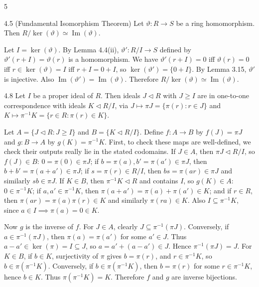 \documentclass[8pt]{extarticle}
\makeatletter
\renewenvironment{proof}[1][\proofname]{%
  \par%
  \pushQED{\qed}%
  \normalfont
  \topsep=2pt\partopsep=0pt\parsep=0pt\itemsep=0pt%
  \trivlist
  \item[\hskip\labelsep\itshape #1\@addpunct{.}]\ignorespaces
}{%
  \popQED\endtrivlist\@endpefalse
  \vspace{-1pt}%
}
\makeatother
\begin{document}
\begin{multicols*}{5}
        \begin{theorem}{4.5}
            (Fundamental Isomorphism Theorem) Let \(\vartheta:R\to S\) be a ring homomorphism. Then \(R/\ker(\vartheta)\simeq\operatorname{Im}(\vartheta)\).
        \end{theorem}

        \begin{proof}
            Let \(I=\ker(\vartheta)\). By Lemma 4.4(ii), \(\vartheta':R/I\to S\) defined by \(\vartheta'(r+I)=\vartheta(r)\) is a homomorphism. We have \(\vartheta'(r+I)=0\) iff \(\vartheta(r)=0\) iff \(r\in\ker(\vartheta)=I\) iff \(r+I=0+I\), so \(\ker(\vartheta')=\{0+I\}\). By Lemma 3.15, \(\vartheta'\) is injective. Also \(\operatorname{Im}(\vartheta')=\operatorname{Im}(\vartheta)\). Therefore \(R/\ker(\vartheta)\simeq\operatorname{Im}(\vartheta)\).
        \end{proof}

        \begin{theorem}{4.8}
            Let \(I\) be a proper ideal of \(R\). Then ideals \(J\lhd R\) with \(J\ge I\) are in one-to-one correspondence with ideals \(K\lhd R/I\), via \(J\mapsto\pi J=\{\pi(r):r\in J\}\) and \(K\mapsto\pi^{-1}K=\{r\in R:\pi(r)\in K\}\).
        \end{theorem}

        \begin{proof}
            Let \(A=\{J\lhd R:J\ge I\}\) and \(B=\{K\lhd R/I\}\). Define \(f:A\to B\) by \(f(J)=\pi J\) and \(g:B\to A\) by \(g(K)=\pi^{-1}K\). First, to check these maps are well-defined, we check their outputs really lie in the stated codomains. If \(J\in A\), then \(\pi J\lhd R/I\), so \(f(J)\in B\): \(0=\pi(0)\in\pi J\); if \(b=\pi(a),b'=\pi(a')\in\pi J\), then \(b+b'=\pi(a+a')\in\pi J\); if \(s=\pi(r)\in R/I\), then \(bs=\pi(ar)\in\pi J\) and similarly \(sb\in\pi J\). If \(K\in B\), then \(\pi^{-1}K\lhd R\) and contains \(I\), so \(g(K)\in A\): \(0\in\pi^{-1}K\); if \(a,a'\in\pi^{-1}K\), then \(\pi(a+a')=\pi(a)+\pi(a')\in K\); and if \(r\in R\), then \(\pi(ar)=\pi(a)\pi(r)\in K\) and similarly \(\pi(ra)\in K\). Also \(I\subseteq\pi^{-1}K\), since \(a\in I\implies\pi(a)=0\in K\).

            Now \(g\) is the inverse of \(f\). For \(J\in A\), clearly \(J\subseteq\pi^{-1}(\pi J)\). Conversely, if \(a\in\pi^{-1}(\pi J)\), then \(\pi(a)=\pi(a')\) for some \(a'\in J\). Thus \(a-a'\in\ker(\pi)=I\subseteq J\), so \(a=a'+(a-a')\in J\). Hence \(\pi^{-1}(\pi J)=J\). For \(K\in B\), if \(b\in K\), surjectivity of \(\pi\) gives \(b=\pi(r)\), and \(r\in\pi^{-1}K\), so \(b\in\pi(\pi^{-1}K)\). Conversely, if \(b\in\pi(\pi^{-1}K)\), then \(b=\pi(r)\) for some \(r\in\pi^{-1}K\), hence \(b\in K\). Thus \(\pi(\pi^{-1}K)=K\). Therefore \(f\) and \(g\) are inverse bijections.
        \end{proof}


\end{multicols*}
\end{document}
